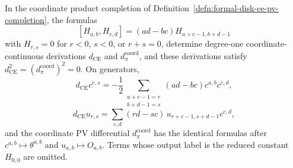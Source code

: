 \begin{lem}\label{lem:formal-disk-ce-schouten-continuity}
  In the coordinate product completion of
  Definition~\ref{defn:formal-disk-ce-pv-completion}, the formulas
  \[
    [H_{a,b},H_{c,d}]=(ad-bc)H_{a+c-1,b+d-1}
  \]
  with \(H_{r,s}=0\) for \(r<0\), \(s<0\), or \(r+s=0\), determine
  degree-one coordinate-continuous derivations
  \(d_{\mathrm{CE}}\) and \(d_\pi^{\mathrm{coord}}\), and these derivations
  satisfy \(d_{\mathrm{CE}}^2=(d_\pi^{\mathrm{coord}})^2=0\).  On generators,
  \[
    d_{\mathrm{CE}}c^{r,s}
      =
      -\frac12
      \sum_{\substack{a+c-1=r\\ b+d-1=s}}
      (ad-bc)c^{a,b}c^{c,d},
  \]
  \[
    d_{\mathrm{CE}}u_{r,s}
      =
      \sum_{c,d}
      (rd-sc)\,
      u_{r+c-1,s+d-1}c^{c,d},
  \]
    and the coordinate PV differential \(d_\pi^{\mathrm{coord}}\) has the identical formulas after
  \(c^{a,b}\mapsto\theta^{a,b}\) and \(u_{a,b}\mapsto O_{a,b}\).
  Terms whose output label is the reduced constant \(H_{0,0}\) are
  omitted.
\end{lem}


